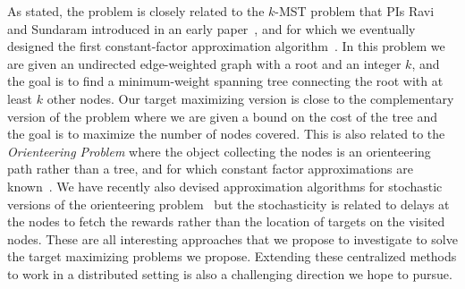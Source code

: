 
As stated, the problem is closely related to the $k$-MST problem that
PIs Ravi and Sundaram introduced in an early paper~\cite{RSMRR94}, and
for which we eventually designed the first constant-factor
approximation algorithm~\cite{BRV99}. In this problem we are given an
undirected edge-weighted graph with a root and an integer $k$, and the
goal is to find a minimum-weight spanning tree connecting the root
with at least $k$ other nodes. Our target maximizing version is close
to the complementary version of the problem where we are given a bound
on the cost of the tree and the goal is to maximize the number of
nodes covered. This is also related to the {\em Orienteering Problem}
where the object collecting the nodes is an orienteering path rather
than a tree, and for which constant factor approximations are
known~\cite{BCKLMM03}. We have recently also devised approximation
algorithms for stochastic versions of the orienteering
problem~\cite{GKNR12} but the stochasticity is related to delays at
the nodes to fetch the rewards rather than the location of targets on
the visited nodes. These are all interesting approaches that we
propose to investigate to solve the target maximizing problems we
propose. Extending these centralized methods to work in a distributed
setting is also a challenging direction we hope to pursue.

\iffalse
RELATED WORK: karger-minkoff maybecast tree, gupta-nagarajan-ravi
paper on adaptive TSP (icalp 10), and on stochastic vrp (OR, 2012) and
refs in this for previous papers on TSP with independent demands on
nodes (Bertsimas cycle heuristic). Also the basic expected target max
is like orienteering with size bound on tree, and hence related to
k-MST. Also related to garg-gupta-leonardi-sankowsi (SODA 08) which
relates to Univ TSP.
\fi


